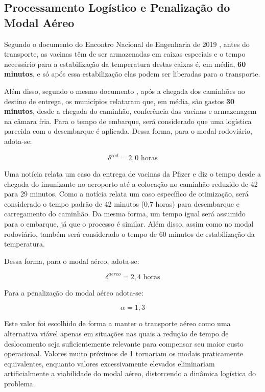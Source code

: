 \subsection{Processamento Logístico e Penalização do Modal Aéreo}


Segundo o documento do Encontro Nacional de Engenharia de 2019 \cite{LimaEtAl:2019}, antes do transporte, as vacinas têm de ser armazenadas em caixas especiais e o tempo necessário para a estabilização da temperatura destas caixas é, em média, \textbf{60 minutos}, e só após essa estabilização elas podem ser liberadas para o transporte. 

Além disso, segundo o mesmo documento \cite{LimaEtAl:2019}, após a chegada dos caminhões ao destino de entrega, os municípios relataram que, em média, são gastos \textbf{30 minutos}, desde a chegada do caminhão, conferência das vacinas e armazenagem na câmara fria. Para o tempo de embarque, será considerado que uma logística parecida com o desembarque é aplicada.  Dessa forma, para o modal rodoviário, adota-se:

\[
\delta^{rod} = 2{,}0 \text{ horas}
\]

Uma notícia \cite{g1campinas:2021} relata um caso da entrega de vacinas da Pfizer e diz o tempo desde a chegada do imunizante no aeroporto até a colocação no caminhão reduzido de 42 para 29 minutos. Como a notícia relata um caso específico de otimização, será considerado o tempo padrão de 42 minutos (0,7 horas) para desembarque e carregamento do caminhão. Da mesma forma, um tempo igual será assumido para o embarque, já que o processo é similar. Além disso, assim como no modal rodoviário, também será considerado o tempo de 60 minutos de estabilização da temperatura. 

Dessa forma, para o modal aéreo, adota-se:

\[
\delta^{aereo} = 2{,}4 \text{ horas}
\]

Para a penalização do modal aéreo adota-se:

\[
\alpha = 1{,}3
\]

Este valor foi escolhido de forma a manter o transporte aéreo como uma alternativa viável apenas em situações nas quais a redução de tempo de deslocamento seja suficientemente relevante para compensar seu maior custo operacional. Valores muito próximos de 1 tornariam os modais praticamente equivalentes, enquanto valores excessivamente elevados eliminariam artificialmente a viabilidade do modal aéreo, distorcendo a dinâmica logística do problema.

